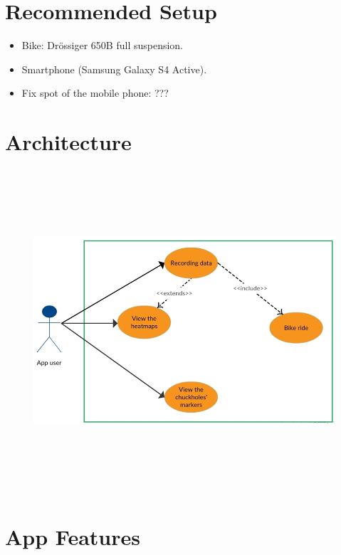\documentclass[10pt,a4paper]{article} %
\begin{document}
 
 
 
    \section{Recommended Setup}
	\begin{itemize} 
	\item Bike: Drössiger 650B full suspension.
	\item Smartphone (Samsung Galaxy S4 Active).
	\item Fix spot of the mobile phone: ???
	
	
	\end{itemize}
	
	


    \section{Architecture}
	
	\begin{figure}[H]
	\centering
    \includegraphics[width=16cm, height=12cm]{UML}
    
    \end{figure}
    
    \section{App Features}
    
    
    \nocite{*}
    
    
\end{document}
